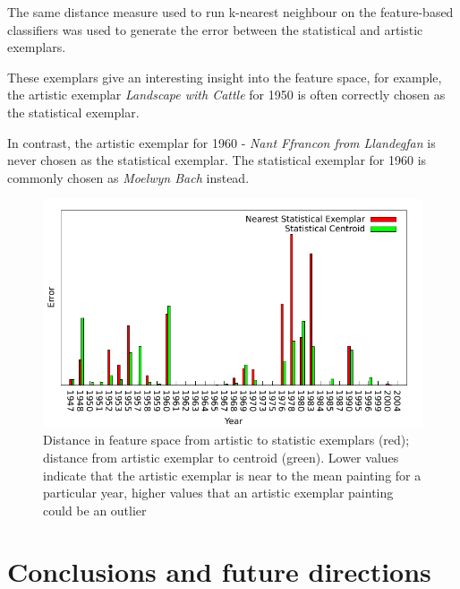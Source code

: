 \documentclass[conference,a4paper]{IEEEtran}
\begin{document}
The same distance measure used to run k-nearest neighbour on the feature-based classifiers was
used to generate the error between the statistical and artistic exemplars.



These exemplars give an interesting insight into the feature space, for example,
the artistic exemplar \emph{Landscape with Cattle} for 1950 is often correctly 
chosen as the statistical exemplar.

In contrast, the artistic exemplar for 1960 - \emph{Nant Ffrancon from Llandegfan}
is never chosen as the statistical exemplar. The statistical exemplar for 1960 is 
commonly chosen as \emph{Moelwyn Bach} instead.

\begin{figure}[h]
\includegraphics[width=\linewidth]{img/exemplar.pdf}
\caption{Distance in feature space from artistic to statistic exemplars (red); distance from
artistic exemplar to centroid (green). Lower values indicate that the artistic
exemplar is near to the mean painting for a particular year, higher values that an
artistic exemplar painting could be an outlier}
\end{figure}


\section{Conclusions and future directions}
\end{document}
